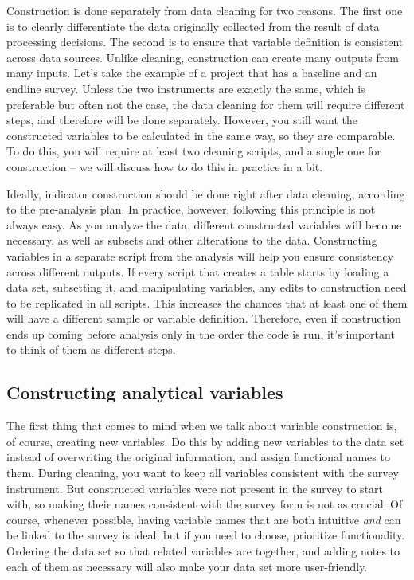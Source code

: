 Construction is done separately from data cleaning for two reasons.
The first one is to clearly differentiate the data originally collected
from the result of data processing decisions.
The second is to ensure that variable definition is consistent across data sources.
Unlike cleaning, construction can create many outputs from many inputs.
Let's take the example of a project that has a baseline and an endline survey.
Unless the two instruments are exactly the same,
which is preferable but often not the case,
the data cleaning for them will require different steps,
and therefore will be done separately.
However, you still want the constructed variables to be calculated in the same way, so they are comparable.
To do this, you will require at least two cleaning scripts,
and a single one for construction --
we will discuss how to do this in practice in a bit.

Ideally, indicator construction should be done right after data cleaning,
according to the pre-analysis plan.
In practice, however, following this principle is not always easy.
As you analyze the data, different constructed variables will become necessary,
as well as subsets and other alterations to the data.
Constructing variables in a separate script from the analysis
will help you ensure consistency across different outputs.
If every script that creates a table starts by loading a data set,
subsetting it, and manipulating variables,
any edits to construction need to be replicated in all scripts.
This increases the chances that at least one of them will have a different sample or variable definition.
Therefore, even if construction ends up coming before analysis only in the order the code is run,
it's important to think of them as different steps.

\subsection{Constructing analytical variables}

The first thing that comes to mind when we talk about variable construction is, of course, creating new variables.
Do this by adding new variables to the data set instead of overwriting the original information,
and assign functional names to them.
During cleaning, you want to keep all variables consistent with the survey instrument.
But constructed variables were not present in the survey to start with,
so making their names consistent with the survey form is not as crucial.
Of course, whenever possible, having variable names that are both intuitive
\textit{and} can be linked to the survey is ideal,
but if you need to choose, prioritize functionality.
Ordering the data set so that related variables are together,
and adding notes to each of them as necessary will also make your data set more user-friendly.

